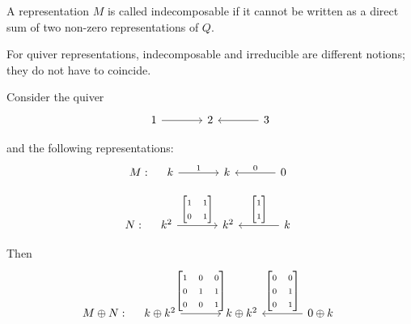 \documentclass[11pt, a4paper]{report}
\begin{document}
\begin{definition}
    A representation $M$ is called indecomposable if it cannot be written as a direct sum of two non-zero representations of $Q$.
\end{definition}

\begin{remark}
    For quiver representations, indecomposable and irreducible are different notions; they do not have to coincide.
\end{remark}

\begin{example}
    Consider the quiver
    \[
        \begin{tikzcd}[column sep=large]
            1 \arrow[r] & 2 & 3 \arrow[l]
        \end{tikzcd}
    \]

    and the following representations:
    \[
        M:\quad
        \begin{tikzcd}[column sep=large]
            k \arrow[r, "1"] & k & 0 \arrow[l, "0"']
        \end{tikzcd}
    \]

    \[
        N:\quad
        \begin{tikzcd}[ampersand replacement=\&, column sep=large]
            k^2 \arrow[r, "{\begin{bmatrix}1 & 1\\0 & 1\end{bmatrix}}"] \&
            k^2 \&
            k \arrow[l, "{\begin{bmatrix}1\\1\end{bmatrix}}"']
        \end{tikzcd}
    \]

    Then
    \[
        M\oplus N:\quad
        \begin{tikzcd}[ampersand replacement=\&, column sep=large]
            k\oplus k^2 \arrow[r, "{\begin{bmatrix}
                1 & 0 & 0 \\
                0 & 1 & 1 \\
                0 & 0 & 1 \\
            \end{bmatrix}}"] \&
            k\oplus k^2 \&
            0\oplus k \arrow[l, "{\begin{bmatrix}
                0 & 0 \\
                0 & 1 \\
                0 & 1 \\
            \end{bmatrix}}"']
        \end{tikzcd}
    \]


\end{example}
\end{document}
